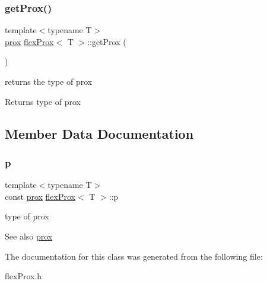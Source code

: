 \mbox{\label{classflex_prox_a86e900bae3979620dcc6de3a5da89c8e}} 
\subsubsection{\texorpdfstring{get\+Prox()}{getProx()}}
{\footnotesize\ttfamily template$<$typename T$>$ \\
\hyperlink{tools_8h_aa34fd4f0962337a24e898ac0abdfff22}{prox} \hyperlink{classflex_prox}{flex\+Prox}$<$ T $>$\+::get\+Prox (\begin{DoxyParamCaption}{ }\end{DoxyParamCaption})\hspace{0.3cm}{\ttfamily [inline]}}



returns the type of prox 

\begin{DoxyReturn}{Returns}
type of prox 
\end{DoxyReturn}


\subsection{Member Data Documentation}
\mbox{\label{classflex_prox_a5e62beeddd95e33d0a55319a05f44855}} 
\subsubsection{\texorpdfstring{p}{p}}
{\footnotesize\ttfamily template$<$typename T$>$ \\
const \hyperlink{tools_8h_aa34fd4f0962337a24e898ac0abdfff22}{prox} \hyperlink{classflex_prox}{flex\+Prox}$<$ T $>$\+::p}



type of prox 

\begin{DoxySeeAlso}{See also}
\hyperlink{tools_8h_aa34fd4f0962337a24e898ac0abdfff22}{prox} 
\end{DoxySeeAlso}


The documentation for this class was generated from the following file\+:\begin{DoxyCompactItemize}
\item 
flex\+Prox.\+h\end{DoxyCompactItemize}
